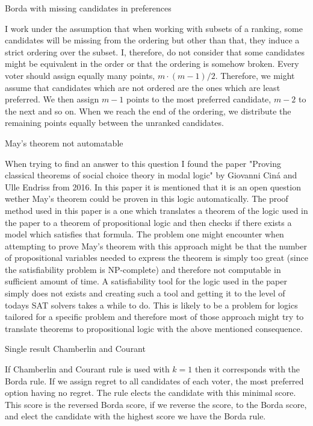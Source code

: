 \documentclass[12pt]{article}
\newenvironment{question}[2][Question]{\begin{trivlist}
\item[\hskip \labelsep {\bfseries #1}\hskip \labelsep {\bfseries #2.}]}{\end{trivlist}}
\newenvironment{answer}[2][Answer]{\begin{trivlist}
\item[\hskip \labelsep {\bfseries #1}\hskip \labelsep {\bfseries #2:}]}{\end{trivlist}}
\begin{document}
\begin{question}{2}{}


\end{question}
\begin{answer}{a)}{Borda with missing candidates in preferences}

I work under the assumption that when working with subsets of a ranking, some candidates will be missing from the ordering but other than that, they induce a strict ordering over the subset. I, therefore, do not consider that some candidates might be equivalent in the order or that the ordering is somehow broken. Every voter should assign equally many points, $m \cdot (m-1)/2$. Therefore, we might assume that candidates which are not ordered are the ones which are least preferred. We then assign $m-1$ points to the most preferred candidate, $m-2$ to the next and so on. When we reach the end of the ordering, we distribute the remaining points equally between the unranked candidates.

\end{answer}
\begin{answer}{b)}{May's theorem not automatable}

When trying to find an answer to this question I found the paper "Proving classical theorems of social choice theory in modal logic" by Giovanni Ciná and Ulle Endriss from 2016. In this paper it is mentioned that it is an open question wether May's theorem could be proven in this logic automatically. The proof method used in this paper is a one which translates a theorem of the logic used in the paper to a theorem of propositional logic and then checks if there exists a model which satisfies that formula. The problem one might encounter when attempting to prove May's theorem with this approach might be that the number of propositional variables needed to express the theorem is simply too great (since the satisfiability problem is NP-complete) and therefore not computable in sufficient amount of time. A satisfiability tool for the logic used in the paper simply does not exists and creating such a tool and getting it to the level of todays SAT solvers takes a while to do. This is likely to be a problem for logics tailored for a specific problem and therefore most of those approach might try to translate theorems to propositional logic with the above mentioned consequence.
\end{answer}
\begin{answer}{c)}{Single result Chamberlin and Courant}

If Chamberlin and Courant rule is used with $k=1$ then it corresponds with the Borda rule. If we assign regret to all candidates of each voter, the most preferred option having no regret. The rule elects the candidate with this minimal score. This score is the reversed Borda score, if we reverse the score, to the Borda score, and elect the candidate with the highest score we have the Borda rule.
\end{answer}
\end{document}

